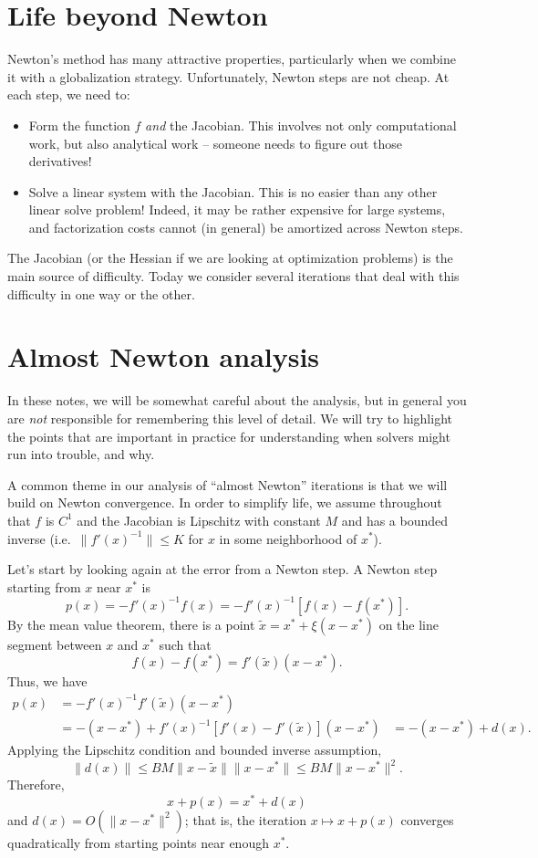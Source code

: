 \documentclass[12pt, leqno]{article} %
\begin{document}

\section*{Life beyond Newton}

Newton's method has many attractive properties, particularly when we
combine it with a globalization strategy.  Unfortunately, Newton steps
are not cheap.  At each step, we need to:
\begin{itemize}
\item Form the function $f$ {\em and} the Jacobian.  This involves not
  only computational work, but also analytical work -- someone needs
  to figure out those derivatives!
\item Solve a linear system with the Jacobian.  This is no easier than
  any other linear solve problem!  Indeed, it may be rather expensive
  for large systems, and factorization costs cannot (in general) be
  amortized across Newton steps.
\end{itemize}
The Jacobian (or the Hessian if we are looking at optimization
problems) is the main source of difficulty.  Today we consider several
iterations that deal with this difficulty in one way or the other.

\section*{Almost Newton analysis}

In these notes, we will be somewhat careful about the analysis, but in
general you are {\em not} responsible for remembering this level of
detail.  We will try to highlight the points that are important in
practice for understanding when solvers might run into trouble, and why.

A common theme in our analysis of ``almost Newton'' iterations is that
we will build on Newton convergence.  In order to simplify life, we
assume throughout that $f$ is $C^1$ and the Jacobian is Lipschitz with
constant $M$ and has a bounded inverse (i.e.~$\|f'(x)^{-1}\| \leq K$
for $x$ in some neighborhood of $x^*$).

Let's start by looking again at the error from a Newton step.
A Newton step starting from $x$ near $x^*$ is
\[
  p(x) = -f'(x)^{-1} f(x) = -f'(x)^{-1} [f(x)-f(x^*)].
\]
By the mean value theorem, there is a point
$\tilde{x} = x^* + \xi (x-x^*)$ on the line segment between
$x$ and $x^*$ such that
\[
  f(x)-f(x^*) = f'(\tilde{x}) (x-x^*).
\]
Thus, we have
\begin{align*}
  p(x)
  &= -f'(x)^{-1} f'(\tilde{x}) (x-x^*) \\
  &= -(x-x^*) + f'(x)^{-1} [f'(x)-f'(\tilde{x})](x-x^*)
  &= -(x-x^*) + d(x).
\end{align*}
Applying the Lipschitz condition and bounded inverse assumption,
\[
  \|d(x)\| \leq BM \|x-\tilde{x}\|\|x-x^*\| \leq BM \|x-x^*\|^2.
\]
Therefore,
\[
  x + p(x) = x^* + d(x)
\]
and $d(x) = O(\|x-x^*\|^2)$; that is, the iteration
$x \mapsto x + p(x)$ converges quadratically from starting points
near enough $x^*$.
\end{document}
